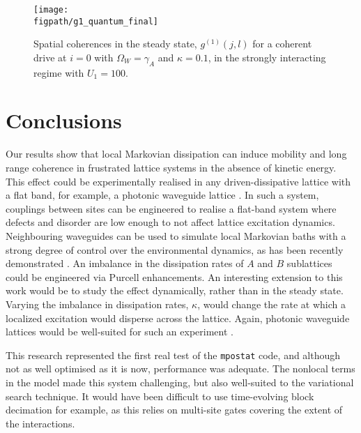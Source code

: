 \begin{figure}[ht!]
\centering
\texttt{[image: \\figpath/g1\_quantum\_final]}
\caption{\label{fig:dim3-3}Spatial coherences in the steady state, \(g^{(1)}(j,l)\) for a coherent drive at \(i=0\) with \(\Omega_{W} = \gamma_{A}\) and \(\kappa = 0.1\), in the strongly interacting regime with \(U_{1} = 100\).}
\end{figure}

\section{Conclusions}
Our results show that local Markovian dissipation can induce mobility and long range coherence in frustrated lattice systems in the absence of kinetic energy. This effect could be experimentally realised in any driven-dissipative lattice with a flat band, for example, a photonic waveguide lattice \cite{Mukherjee2015}. In such a system, couplings between sites can be engineered to realise a flat-band system where defects and disorder are low enough to not affect lattice excitation dynamics. Neighbouring waveguides can be used to simulate local Markovian baths with a strong degree of control over the environmental dynamics, as has been recently demonstrated \cite{Mukherjee2017}. An imbalance in the dissipation rates of \(A\) and \(B\) sublattices could be engineered via Purcell enhancements. An interesting extension to this work would be to study the effect dynamically, rather than in the steady state. Varying the imbalance in dissipation rates, \(\kappa\), would change the rate at which a localized excitation would disperse across the lattice. Again, photonic waveguide lattices would be well-suited for such an experiment \cite{Mukherjee2015}.

This research represented the first real test of the \lstinline$mpostat$ code, and although not as well optimised as it is now, performance was adequate. The nonlocal terms in the model made this system challenging, but also well-suited to the variational search technique. It would have been difficult to use time-evolving block decimation for example, as this relies on multi-site gates covering the extent of the interactions.
